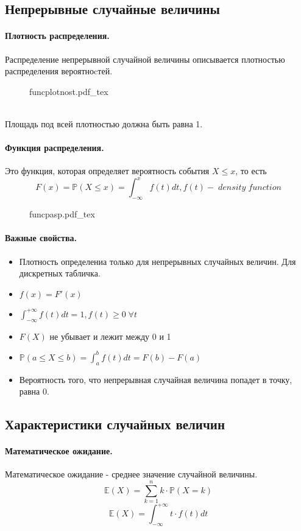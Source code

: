 \documentclass{article}
\newcommand{\E}{\mathbb{E}}
\newcommand{\PP}{\mathbb{P}}
\newcommand{\incfig}[2][1]{%
    \def\svgwidth{#1\columnwidth}
    {#2.pdf_tex}
}
\begin{document}
\subsection{Непрерывные случайные величины}
\paragraph{Плотность распределения.} Распределение непрерывной случайной величины описывается плотностью распределения вероятноcтей.
\begin{figure}[h!]
  \centering
  \incfig{funcplotnost}
\end{figure}
\\
Площадь под всей плотностью должна быть равна 1.
\paragraph{Функция распределения.} Это функция, которая определяет вероятность события $X \leq x$, то есть
\[
F(x) = \PP(X \leq x) = \int_{-\infty}^{x}f(t)dt, f(t) - \; density \; function
\]
\begin{figure}[h!]
  \centering
  \incfig{funcpasp}
\end{figure}
\paragraph{Важные свойства.}
\begin{itemize}
	\item Плотность определениа только для непрерывных случайных величин. Для дискретных табличка.
	\item $f(x) = F'(x)$
    \item $\int_{-\infty}^{+\infty}f(t)dt=1, f(t) \geq 0 \; \forall t$
    \item $F(X)$ не убывает и лежит между 0 и 1
    \item $\PP(a \leq X \leq b) = \int_{a}^{b}f(t)dt=F(b)- F(a)$
    \item Вероятность того, что непрерывная случайная величина попадет в точку, равна 0.
\end{itemize}
\subsection{Характеристики случайных величин}
\paragraph{Математическое ожидание.}
Математическое ожидание - среднее значение случайной величины.
\[
\E(X)=\sum_{k=1}^{n}k \cdot \PP(X=k)
\]
\[
\E(X)=\int_{-\infty}^{+\infty}t \cdot f(t)dt
\]
\end{document}
